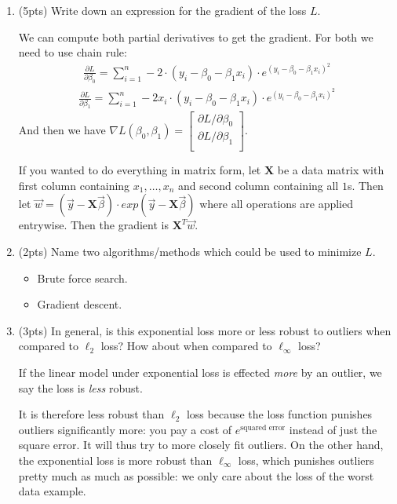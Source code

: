 \documentclass[10pt]{article}
\begin{document}
\begin{enumerate}[label=(\alph*)]
	\item (5pts) Write down an expression for the gradient of the loss $L$.
	
	\vspace{1em}
	\color{blue}
	We can compute both partial derivatives to get the gradient. For both we need to use chain rule:
	\begin{align*}
	\frac{\partial L}{\partial \beta_0} =\sum_{i=1}^n -2\cdot (y_i - \beta_0 - \beta_1 x_i)\cdot e^{(y_i - \beta_0 - \beta_1 x_i)^2}
	\end{align*}
	\begin{align*}
	\frac{\partial L}{\partial \beta_1} = \sum_{i=1}^n -2x_i\cdot (y_i - \beta_0 - \beta_1 x_i)\cdot e^{(y_i - \beta_0 - \beta_1 x_i)^2}
	\end{align*}
	And then we have $\nabla L(\beta_0, \beta_1) = \begin{bmatrix}\partial L/\partial \beta_0 \\ \partial L/\partial \beta_1 \\\end{bmatrix}$.
	
	If you wanted to do everything in matrix form, let $\mathbf{X}$ be a data matrix with first column containing $x_1, \ldots, x_n$ and second column containing all $1$s. Then let $\vec{w} = (\vec{y}-\mathbf{X}\vec{\beta})\cdot exp(\vec{y}-\mathbf{X}\vec{\beta})$ where all operations are applied entrywise. Then the gradient is $\textbf{X}^T \vec{w}$.
	\color{black}
	\vspace{1em}
	
	\item (2pts) Name two algorithms/methods which could be used to minimize $L$.
		\vspace{1em}
	\color{blue}
		\begin{itemize}
			\item Brute force search. 
			\item Gradient descent. 
		\end{itemize}
	\color{black}
	
	\item (3pts) In general, is this exponential loss more or less robust to outliers when compared to $\ell_2$ loss? How about when compared to $\ell_\infty$ loss? 
	
	\vspace{1em}
	\color{blue}
	If the linear model under exponential loss is effected \emph{more} by an outlier, we say the loss is \emph{less} robust.
	
	It is therefore less robust than $\ell_2$ loss because the loss function punishes outliers significantly more: you pay a cost of $e^{\text{squared error}}$ instead of just the square error. It will thus try to more closely fit outliers.
	On the other hand, the exponential loss is more robust than $\ell_\infty$ loss, which punishes outliers pretty much as much as possible: we only care about the loss of the worst data example.
	\color{black}
	\vspace{1em}
\end{enumerate}
\end{document}
